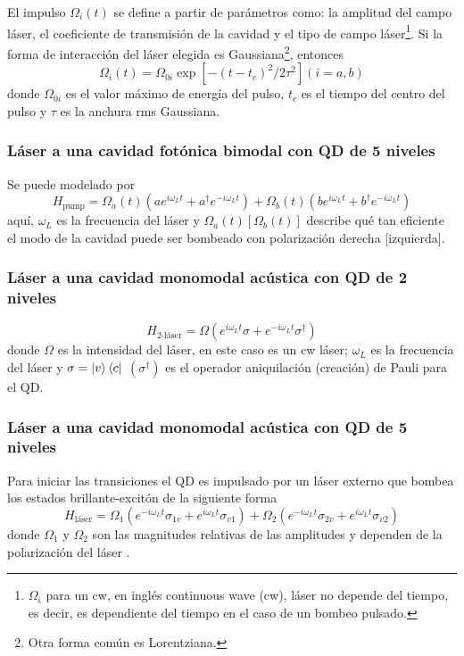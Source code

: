 \documentclass[main.tex]{subfiles}
\begin{document}
El impulso $\Omega_i(t)$ se define a partir de parámetros como: la amplitud del campo láser, el coeficiente de transmisión de la cavidad y el tipo de campo láser\footnote{$\Omega_i$ para un cw, en inglés continuous wave (cw), láser no depende del tiempo, es decir, es dependiente del tiempo en el caso de un bombeo pulsado.}. Si la forma de interacción del láser elegida es Gaussiana\footnote{Otra forma común es Lorentziana.}, entonces
\begin{equation}
	\Omega_i(t) = \Omega_{0i}\exp[-(t-t_c)^2/2\tau^2] (i=a,b)
\end{equation}
donde $\Omega_{0i}$ es el valor máximo de energía del pulso, $t_c$ es el tiempo del centro del pulso y $\tau$ es la anchura rms Gaussiana.

\subsubsection{Láser a una cavidad fotónica bimodal con QD de 5 niveles}
Se puede modelado por
\begin{equation}\label{eq:H_pump}
	H_\text{pump} = \Omega_a (t) (ae^{i\omega_L t} + a^\dagger e^{-i\omega_L t}) + \Omega_b (t) (be^{i\omega_L t} + b^\dagger e^{-i\omega_L t})
\end{equation}
aquí, $\omega_L$ es la frecuencia del láser y $\Omega_a(t)[\Omega_b(t)]$ describe qué tan eficiente el modo de la cavidad puede ser bombeado con polarización derecha [izquierda].

\subsubsection{Láser a una cavidad monomodal acústica con QD de 2 niveles}
\begin{equation}
	H_\text{2-láser} = \Omega(e^{i\omega_L t} \sigma + e^{-i\omega_L t} \sigma^\dagger)
\end{equation}
donde $\Omega$ es la intensidad del láser, en este caso es un cw láser; $\omega_L$ es la frecuencia del láser y 
$\sigma = \ket{v}\bra{c}$  $(\sigma^\dagger)$ es el operador aniquilación (creación) de Pauli para el QD.

\subsubsection{Láser a una cavidad monomodal acústica con QD de 5 niveles}
Para iniciar las transiciones el QD es impulsado por un láser externo que bombea los estados brillante-excitón de la siguiente forma
\begin{equation}\label{eq:5-laser}
	H_\text{láser} = \Omega_1 (e^{-i\omega_L t}\sigma_{1v} + e^{i\omega_L t}\sigma_{v1}) + \Omega_2 (e^{-i\omega_L t}\sigma_{2v} + e^{i\omega_L t}\sigma_{v2})
\end{equation}
donde $\Omega_1$ y $\Omega_2$ son las magnitudes relativas de las amplitudes y dependen de la polarización del láser \parencite{Belhadj2009}.
\end{document}
